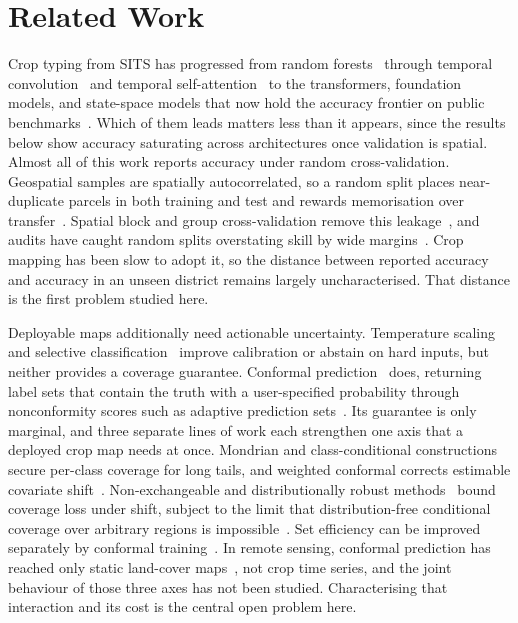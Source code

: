 \documentclass[conference]{IEEEtran}
\begin{document}
\section{Related Work}
Crop typing from SITS has progressed from random forests~\cite{roberts2017cv} through
temporal convolution~\cite{pelletier2019tempcnn} and temporal
self-attention~\cite{garnot2020ltae} to the transformers, foundation
models, and state-space models that now hold the accuracy
frontier on public benchmarks~\cite{tarasiou2023tsvit,tseng2024presto,gu2022s4d}.
Which of them leads matters less than it appears, since the results below show
accuracy saturating across architectures once validation is spatial. Almost all of
this work reports accuracy under random cross-validation. Geospatial samples are
spatially autocorrelated, so a random split places near-duplicate parcels in both
training and test and rewards memorisation over transfer~\cite{roberts2017cv}.
Spatial block and group cross-validation remove this
leakage~\cite{meyer2019spatialcv}, and audits have caught random splits overstating
skill by wide margins~\cite{ploton2020spatial}. Crop mapping has been slow to adopt
it, so the distance between reported accuracy and accuracy in an unseen district
remains largely uncharacterised. That distance is the first problem studied here.

Deployable maps additionally need actionable uncertainty. Temperature
scaling~\cite{guo2017calibration} and selective
classification~\cite{geifman2017selective} improve calibration or abstain on hard
inputs, but neither provides a coverage guarantee. Conformal
prediction~\cite{vovk2005algorithmic,angelopoulos2023conformal} does, returning label
sets that contain the truth with a user-specified probability through nonconformity
scores such as adaptive prediction sets~\cite{romano2020aps}. Its guarantee is only
marginal, and three separate lines
of work each strengthen one axis that a deployed crop map needs at once. Mondrian and
class-conditional constructions~\cite{ding2024longtailconformal} secure per-class
coverage for long tails, and weighted conformal corrects estimable covariate
shift~\cite{tibshirani2019covshift}. Non-exchangeable and distributionally robust
methods~\cite{barber2023nonexchangeable,cauchois2024robust} bound
coverage loss under shift, subject to the limit that distribution-free conditional
coverage over arbitrary regions is impossible~\cite{barber2023nonexchangeable}. Set
efficiency can be improved separately by conformal training~\cite{stutz2022conformal}.
In remote sensing, conformal prediction has reached only static land-cover
maps~\cite{singh2024conformallulc}, not crop time series, and the joint behaviour of
those three axes has not been studied. Characterising that interaction and its cost is
the central open problem here.
\end{document}

